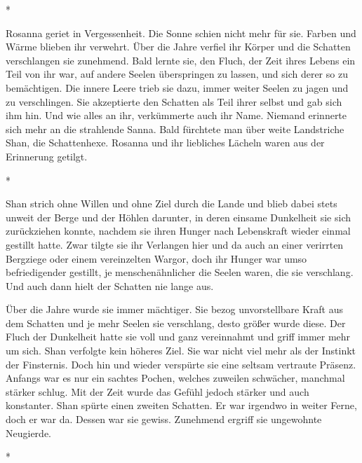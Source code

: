 \documentclass[10pt, a4paper, oneside]{book}
\begin{document}
\begin{multicols}{2}
\begin{center}
    *
\end{center}

Rosanna geriet in Vergessenheit. Die Sonne schien nicht mehr für sie. Farben und Wärme blieben ihr verwehrt. Über die Jahre verfiel ihr Körper und die Schatten verschlangen sie zunehmend. Bald lernte sie, den Fluch, der Zeit ihres Lebens ein Teil von ihr war, auf andere Seelen überspringen zu lassen, und sich derer so zu bemächtigen. Die innere Leere trieb sie dazu, immer weiter Seelen zu jagen und zu verschlingen. Sie akzeptierte den Schatten als Teil ihrer selbst und gab sich ihm hin. Und wie alles an ihr, verkümmerte auch ihr Name. Niemand erinnerte sich mehr an die strahlende Sanna. Bald fürchtete man über weite Landstriche Shan, die Schattenhexe. Rosanna und ihr liebliches Lächeln waren aus der Erinnerung getilgt. 

\begin{center}
    *
\end{center}

Shan strich ohne Willen und ohne Ziel durch die Lande und blieb dabei stets unweit der Berge und der Höhlen darunter, in deren einsame Dunkelheit sie sich zurückziehen konnte, nachdem sie ihren Hunger nach Lebenskraft wieder einmal gestillt hatte. Zwar tilgte sie ihr Verlangen hier und da auch an einer verirrten Bergziege oder einem vereinzelten Wargor, doch ihr Hunger war umso befriedigender gestillt, je menschenähnlicher die Seelen waren, die sie verschlang. Und auch dann hielt der Schatten nie lange aus.\bigskip

Über die Jahre wurde sie immer mächtiger. Sie bezog unvorstellbare Kraft aus dem Schatten und je mehr Seelen sie verschlang, desto größer wurde diese. Der Fluch der Dunkelheit hatte sie voll und ganz vereinnahmt und griff immer mehr um sich. Shan verfolgte kein höheres Ziel. Sie war nicht viel mehr als der Instinkt der Finsternis. Doch hin und wieder verspürte sie eine seltsam vertraute Präsenz. Anfangs war es nur ein sachtes Pochen, welches zuweilen schwächer, manchmal stärker schlug. Mit der Zeit wurde das Gefühl jedoch stärker und auch konstanter. Shan spürte einen zweiten Schatten. Er war irgendwo in weiter Ferne, doch er war da. Dessen war sie gewiss. Zunehmend ergriff sie ungewohnte Neugierde. 

\begin{center}
    *
\end{center}


\end{multicols}
\end{document}
